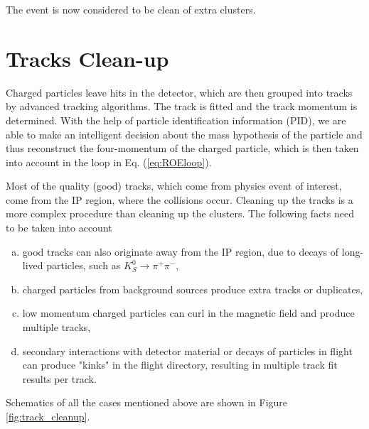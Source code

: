 The event is now considered to be clean of extra clusters.

\section{Tracks Clean-up}

Charged particles leave hits in the detector, which are then grouped into tracks by advanced tracking algorithms. The track is fitted and the track momentum is determined. With the help of particle identification information (PID), we are able to make an intelligent decision about the mass hypothesis of the particle and thus reconstruct the four-momentum of the charged particle, which is then taken into account in the loop in Eq. (\ref{eq:ROEloop}).

Most of the quality (good) tracks, which come from physics event of interest, come from the IP region, where the collisions occur. Cleaning up the tracks is a more complex procedure than cleaning up the clusters. The following facts need to be taken into account
\begin{enumerate}[(a)]
	\item good tracks can also originate away from the IP region, due to decays of long-lived particles, such as $K_S^0 \to \pi^+ \pi^-$,
	\item charged particles from background sources produce extra tracks or duplicates,
	\item low momentum charged particles can curl in the magnetic field and produce multiple tracks,
	\item secondary interactions with detector material or decays of particles in flight can produce "kinks" in the flight directory, resulting in multiple track fit results per track.
\end{enumerate}

Schematics of all the cases mentioned above are shown in Figure \ref{fig:track_cleanup}.

